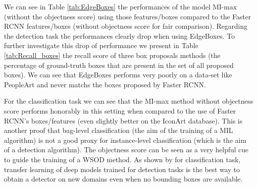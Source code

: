 \documentclass[preprint]{elsarticle}
\newcommand\MILS{MI-max}
\begin{document}
We can see in Table \ref{tab:EdgeBoxes} the performances of the model \MILS{} (without the objectness score) using  those features/boxes compared to the Faster RCNN features/boxes (without objectness score for fair comparison).
Regarding the detection task the performances clearly drop when using EdgeBoxes.
To further investigate this drop of performance we present in Table \ref{tab:Recall_boxes}  the recall score of three box proposals methods (the percentage of ground-truth boxes that are present in the set of all proposed boxes). We can see that EdgeBoxes performs very poorly on a data-set like PeopleArt and never matchs the boxes proposed by Faster RCNN.



For the classification task  we can see that the \MILS{} method without objectness score performs honorably in this setting when compared to the use of Faster RCNN's  boxes/features (even slightly better on  the IconArt database). This is another proof that bag-level classification (the aim of the training of a MIL algorithm) is not a good proxy for instance-level classification (which is the aim of a detection algorithm). The objectness score can be seen as a very helpful cue to guide the training of a WSOD method. As shown by \cite{donahue_decaf_2013} for classification task, transfer learning of deep models trained for detection tasks is the best way to obtain a detector on new domains even when no  bounding boxes are available.
\end{document}
